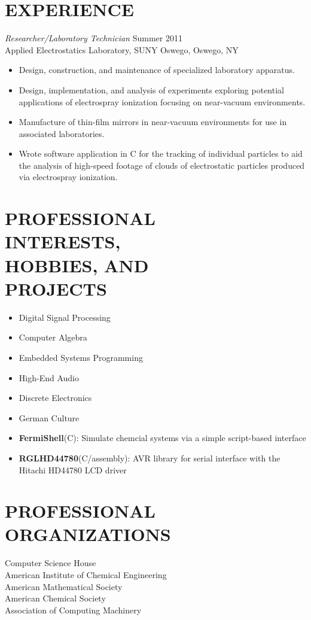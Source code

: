 \documentclass[line,margin]{res}
\begin{document}
\begin{resume}
\section{EXPERIENCE} {\sl Researcher/Laboratory Technician} \hfill Summer 2011 \\
                Applied Electrostatics Laboratory, 
                SUNY Oswego, Oswego, NY
                 \begin{itemize}  \itemsep -2pt %
                \item   Design, construction, and maintenance of 
				        specialized laboratory apparatus.
                \item   Design, implementation, and analysis of
				        experiments exploring potential applications
						of electrospray ionization focusing
						on near-vacuum environments.
				\item   Manufacture of thin-film mirrors in
				        near-vacuum environments for use in
						associated laboratories.
				\item   Wrote software application in C
						for the tracking of individual particles
						to aid the analysis of high-speed footage
						of clouds of electrostatic particles
						produced via electrospray ionization.
                \end{itemize}

\section{PROFESSIONAL \\ INTERESTS, \\ HOBBIES, AND \\ PROJECTS}
				\begin{itemize} \itemsep -2pt
				\item	Digital Signal Processing
				\item	Computer Algebra
				\item	Embedded Systems Programming
				\item	High-End Audio
				\item	Discrete Electronics
				\item	German Culture
				\item	\textbf{FermiShell}(C): Simulate chemcial systems via a simple script-based interface
				\item	\textbf{RGLHD44780}(C/assembly): AVR library for serial interface with the Hitachi HD44780 LCD driver
				\end{itemize}

\section{PROFESSIONAL ORGANIZATIONS}             
            	Computer Science House\\
                American Institute of Chemical Engineering\\
				American Mathematical Society\\
				American Chemical Society\\
				Association of Computing Machinery\\


\end{resume}
\end{document}
